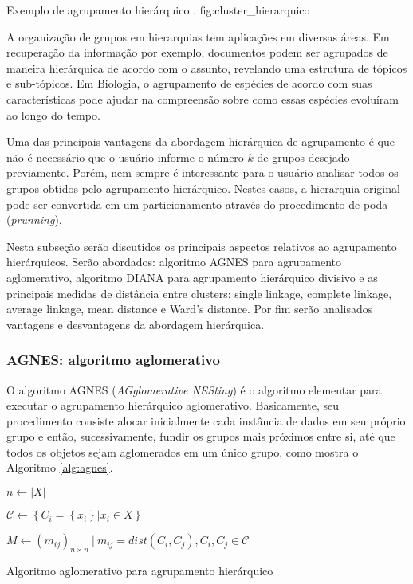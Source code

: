 {Exemplo de agrupamento hierárquico \cite{tan2009introducao}.}
{fig:cluster_hierarquico}

A organização de grupos em hierarquias tem aplicações em diversas áreas. Em 
recuperação da informação por exemplo, documentos podem ser agrupados de maneira
hierárquica de acordo com o assunto, revelando uma estrutura de tópicos e
sub-tópicos. Em Biologia, o agrupamento de espécies de acordo com suas
características pode ajudar na compreensão sobre como essas espécies evoluíram
ao longo do tempo.

Uma das principais vantagens da abordagem hierárquica de agrupamento é que não
é necessário que o usuário informe o número $k$ de grupos desejado previamente.
Porém, nem sempre é interessante para o usuário analisar todos os grupos obtidos
pelo agrupamento hierárquico. Nestes casos, a hierarquia original pode ser
convertida em um particionamento através do procedimento de poda
(\emph{prunning}). 

Nesta subseção serão discutidos os principais aspectos relativos ao agrupamento
hierárquicos. Serão abordados: algoritmo AGNES para agrupamento aglomerativo, 
algoritmo DIANA para agrupamento hierárquico divisivo e as principais medidas
de distância entre clusters: single linkage, complete linkage, average linkage,
mean distance e Ward's distance. Por fim serão analisados vantagens e
desvantagens da abordagem hierárquica.

\subsubsection{AGNES: algoritmo aglomerativo}

O algoritmo AGNES (\emph{AGglomerative NESting}) é o algoritmo elementar para
executar o agrupamento hierárquico aglomerativo. Basicamente, seu procedimento
consiste alocar inicialmente cada instância de dados em seu próprio grupo e
então, sucessivamente, fundir os grupos mais próximos entre si, até que todos os
objetos sejam aglomerados em um único grupo, como mostra o Algoritmo
\ref{alg:agnes}.

\begin{algorithm}[htbp]
	
	$n \leftarrow \left|X\right|$ \;
			
	$\mathcal{C} \leftarrow \left\{ C_i = \left\{x_i\right\} | 
		x_i \in X \right\} $ \;
		
	$M \leftarrow \left(m_{ij}\right)_{n \times n}\ |\ m_{ij} = 
		dist\left(C_i,C_j\right), C_i, C_j \in \mathcal{C}$ \;
	
	
	\caption{Algoritmo aglomerativo para agrupamento hierárquico}
	\label{alg:agnes}
\end{algorithm}


